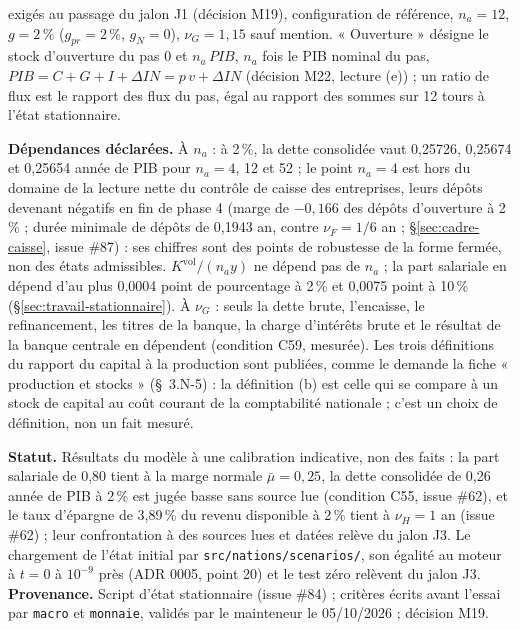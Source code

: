 \documentclass[11pt,a4paper]{article}
\begin{document}
\begin{proposee}
exigés au passage du jalon J1 (décision M19), configuration de référence, $n_a = 12$, $g = 2\,\%$ ($g_{\mathit{pr}} = 2\,\%$, $g_N = 0$), $\nu_G = 1{,}15$ sauf mention. « Ouverture » désigne le stock d'ouverture du pas 0 et $n_a\,\mathit{PIB}$, $n_a$ fois le PIB nominal du pas, $\mathit{PIB} = C + G + I + \Delta\mathit{IN} = p\,v + \Delta\mathit{IN}$ (décision M22, lecture (e)) ; un ratio de flux est le rapport des flux du pas, égal au rapport des sommes sur 12 tours à l'état stationnaire.

\textbf{Dépendances déclarées.} À $n_a$ : à 2\,\%, la dette consolidée vaut 0,25726, 0,25674 et 0,25654 année de PIB pour $n_a = 4$, 12 et 52 ; le point $n_a = 4$ est hors du domaine de la lecture nette du contrôle de caisse des entreprises, leurs dépôts devenant négatifs en fin de phase 4 (marge de $-0{,}166$ des dépôts d'ouverture à 2\,\% ; durée minimale de dépôts de 0,1943 an, contre $\nu_F = 1/6$ an ; \S\ref{sec:cadre-caisse}, issue \#87) : ses chiffres sont des points de robustesse de la forme fermée, non des états admissibles. $K^{\mathrm{vol}}/(n_a y)$ ne dépend pas de $n_a$ ; la part salariale en dépend d'au plus 0,0004 point de pourcentage à 2\,\% et 0,0075 point à 10\,\% (\S\ref{sec:travail-stationnaire}). À $\nu_G$ : seuls la dette brute, l'encaisse, le refinancement, les titres de la banque, la charge d'intérêts brute et le résultat de la banque centrale en dépendent (condition C59, mesurée). Les trois définitions du rapport du capital à la production sont publiées, comme le demande la fiche « production et stocks » (\S~\mbox{3.N-5}) : la définition (b) est celle qui se compare à un stock de capital au coût courant de la comptabilité nationale ; c'est un choix de définition, non un fait mesuré.

\textbf{Statut.} Résultats du modèle à une calibration indicative, non des faits : la part salariale de 0,80 tient à la marge normale $\bar\mu = 0{,}25$, la dette consolidée de 0,26 année de PIB à 2\,\% est jugée basse sans source lue (condition C55, issue \#62), et le taux d'épargne de 3,89\,\% du revenu disponible à 2\,\% tient à $\nu_H = 1$ an (issue \#62) ; leur confrontation à des sources lues et datées relève du jalon J3. Le chargement de l'état initial par \nolinkurl{src/nations/scenarios/}, son égalité au moteur à $t = 0$ à $10^{-9}$ près (ADR 0005, point 20) et le test zéro relèvent du jalon J3. \textbf{Provenance.} Script d'état stationnaire (issue \#84) ; critères écrits avant l'essai par \texttt{macro} et \texttt{monnaie}, validés par le mainteneur le 05/10/2026 ; décision M19.
\end{proposee}
\end{document}
